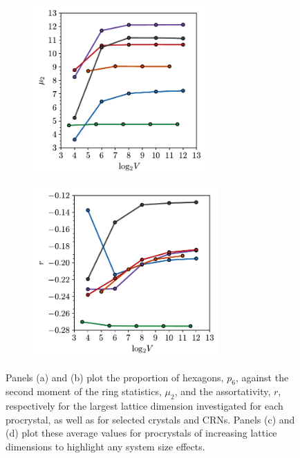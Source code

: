 \begin{figure}[bt]
     \begin{subfigure}[b]{0.45\textwidth}
         \centering
         \includegraphics[height=6.5cm]{./figures/procrystals/pro3_ss_mu2.pdf}
         \caption{}
         \label{fig:pro3p6ssmu2}
     \end{subfigure}
     \hfill
        \begin{subfigure}[b]{0.45\textwidth}
         \centering
         \includegraphics[height=6.5cm]{./figures/procrystals/pro3_ss_r.pdf}
         \caption{}
         \label{fig:pro3p6ssr}
     \end{subfigure}
     
     \caption{Panels (a) and (b) plot the proportion of hexagons, $p_6$, against the second moment of the ring statistics, $\mu_2$, and the assortativity, $r$, respectively for the largest lattice dimension investigated for each procrystal, as well as for selected crystals and CRNs. Panels (c) and (d) plot these average values for procrystals of increasing lattice dimensions to highlight any system size effects.}
     \label{fig:pro3p6mu2r}
\end{figure}

